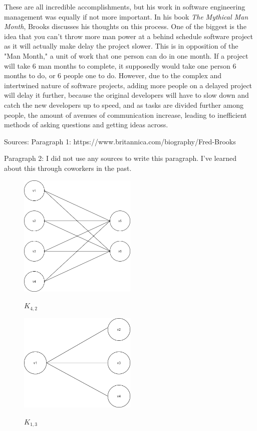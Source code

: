 \documentclass{article}
\begin{document}
\begin{enumerate}
These are all incredible accomplishments, but his work in software engineering
 management was equally if not more important. In his book \emph{The Mythical Man Month}, 
Brooks discusses his thoughts on this process. One of the biggest is the idea that you can't throw
more man power at a behind schedule software project as it will actually make delay the project slower.
This is in opposition of the "Man Month," a unit of work that one person can do in one month. If a project
will take 6 man months to complete, it supposedly would take one person 6 months to do, or 6 people one
to do. However, due to the complex and intertwined nature of software projects, adding more people
on a delayed project will delay it further, because the original developers will have to slow down 
and catch the new developers up to speed, and as tasks are divided further among people, the
amount of avenues of communication increase, leading to inefficient methods of asking questions
and getting ideas across. 

Sources:
Paragraph 1: https://www.britannica.com/biography/Fred-Brooks

Paragraph 2: I did not use any sources to write this paragraph. I've learned about this through coworkers in the past.

\newpage




\pagebreak
\begin{figure}
\caption{$K_{4, 2}$}
\centering
\includegraphics[width=0.5\textwidth]{Graph1}
\label{Graph1}
\end{figure}

\begin{figure}
\caption{$K_{1, 3}$}
\centering
\includegraphics[width=0.5\textwidth]{Graph2}
\label{Graph2}
\end{figure}


\end{enumerate}
\end{document}

